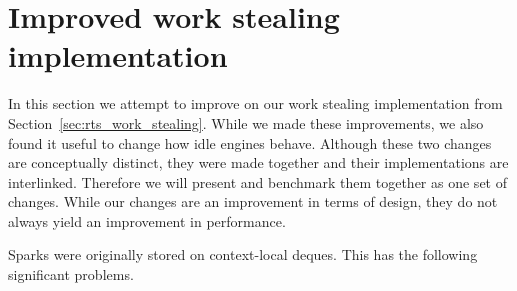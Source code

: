 
\section{Improved work stealing implementation}
\label{sec:rts_work_stealing2}

In this section we attempt to improve on our work stealing
implementation from Section~\ref{sec:rts_work_stealing}.
While we made these improvements,
we also found it useful to change how idle engines behave.
Although these two changes are conceptually distinct,
they were made together and their implementations are interlinked.
Therefore we will present and benchmark them together as one set of changes.
While our changes are an improvement in terms of design,
they do not always yield an improvement in performance.

Sparks were originally stored on context-local deques.
This has the following significant problems.

